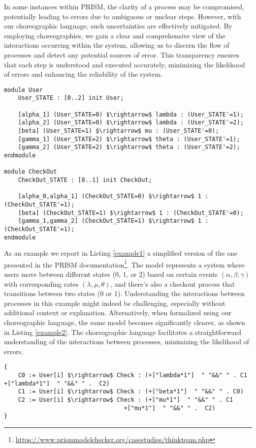 
In some instances within PRISM, the clarity of a process may be compromised, potentially leading to errors due to ambiguous or unclear steps. However, with our choreographic language, such uncertainties are effectively mitigated. By employing choreographies, we gain a clear and comprehensive view of the interactions occurring within the system, allowing us to discern the flow of processes and detect any potential sources of error. This transparency ensures that each step is understood and executed accurately, minimizing the likelihood of errors and enhancing the reliability of the system.
\begin{lstlisting}[style=prism-color,caption={A PRISM example},captionpos=b,label={example1}]
module User
	User_STATE : [0..2] init User;

	[alpha_1] (User_STATE=0) $\rightarrow$ lambda : (User_STATE'=1);
	[alpha_2] (User_STATE=0) $\rightarrow$ lambda : (User_STATE'=2);
	[beta] (User_STATE=1) $\rightarrow$ mu : (User_STATE'=0);
	[gamma_1] (User_STATE=2) $\rightarrow$ theta : (User_STATE'=1);
	[gamma_2] (User_STATE=2) $\rightarrow$ theta : (User_STATE'=2);
endmodule

module CheckOut
	CheckOut_STATE : [0..1] init CheckOut;

	[alpha_0,alpha_1] (CheckOut_STATE=0) $\rightarrow$ 1 : (CheckOut_STATE'=1);
	[beta] (CheckOut_STATE=1) $\rightarrow$ 1 : (CheckOut_STATE'=0);
	[gamma_1,gamma_2] (CheckOut_STATE=1) $\rightarrow$ 1 : (CheckOut_STATE'=1);
endmodule
\end{lstlisting}

As an example we report in Listing \ref{example1} a simplified version of the one presented in the PRISM documentation\footnote{\url{https://www.prismmodelchecker.org/casestudies/thinkteam.php}}. The model represents a system where users move between different states (0, 1, or 2) based on certain events $(\alpha, \beta, \gamma)$ with corresponding rates $(\lambda, \mu, \theta)$, and there's also a checkout process that transitions between two states (0 or 1).
Understanding the interactions between processes in this example might indeed be challenging, especially without additional context or explanation. 
Alternatively, when formalized using our choreographic language, the same model becomes significantly clearer, as shown in Listing \ref{example2}. The choreographic language facilitates a straightforward understanding of the interactions between processes, minimizing the likelihood of errors.

\begin{lstlisting}[style=chor-color,caption={Example of Listing \ref{example1} in our choreographic language},captionpos=b,label={example2}]
{
    C0 := User[i] $\rightarrow$ Check : (+["lambda*1"]  " "&&" " . C1								+["lambda*1"]  " "&&" " .  C2)
    C1 := User[i] $\rightarrow$ Check : (+["beta*1"]  " "&&" " . C0)  
    C2 := User[i] $\rightarrow$ Check : (+["mu*1"]  " "&&" " . C1
                                  +["mu*1"]  " "&&" " .  C2)
}
\end{lstlisting}




